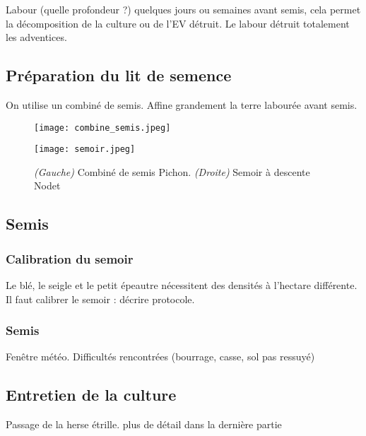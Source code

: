 \documentclass{article}
\begin{document}
Labour (quelle profondeur ?) quelques jours ou semaines avant semis, cela permet la décomposition de la culture ou de l'EV détruit. 
Le labour détruit totalement les adventices.

\subsection{Préparation du lit de semence}

On utilise un combiné de semis. Affine grandement la terre labourée avant semis.

\begin{figure}[h!]
\centering
\begin{minipage}{.5\textwidth}
  \centering
  \texttt{[image: combine\_semis.jpeg]}
  \label{fig:test1}
\end{minipage}%
\begin{minipage}{.5\textwidth}
  \centering
  \texttt{[image: semoir.jpeg]}
  \label{fig:test2}
\end{minipage}
\caption{\textit{(Gauche)} Combiné de semis Pichon. \textit{(Droite)} Semoir à descente Nodet}
\label{fig:test}
\end{figure}

\subsection{Semis}

\subsubsection{Calibration du semoir}

Le blé, le seigle et le petit épeautre nécessitent des densités à l'hectare différente. Il faut calibrer le semoir : décrire protocole.

\subsubsection{Semis}

Fenêtre météo. Difficultés rencontrées (bourrage, casse, sol pas ressuyé)

\subsection*{Entretien de la culture}

Passage de la herse étrille. plus de détail dans la dernière partie
\end{document}

